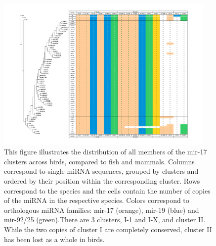 \documentclass[10pt]{bmc_article}
\newenvironment{bmcformat}{\begin{raggedright}\baselineskip20pt\sloppy\setboolean{publ}{false}}{\end{raggedright}\baselineskip20pt\sloppy}
\begin{document}
\begin{bmcformat}
\begin{figure}[ht]
  \includegraphics[width=0.95\textwidth]{figures/mir-17-cluster.pdf}
  \caption[Presence/absence table of mir-17 miRNA clusters]{ This
    figure illustrates the distribution of all members of the mir-17
    clusters across birds, compared to fish and mammals. Columns
    correspond to single miRNA sequences, grouped by clusters and
    ordered by their position within the corresponding cluster. Rows
    correspond to the species and the cells contain the number of
    copies of the miRNA in the respective species. Colors correspond
    to orthologous miRNA families: mir-17 (orange), mir-19 (blue) and
    mir-92/25 (green).There are 3 clusters, I-1 and I-X, and cluster
    II.  While the two copies of cluster I are completely conserved,
    cluster II has been lost as a whole in birds.}\label{fig:8}
\end{figure}




\end{bmcformat}
\end{document}

